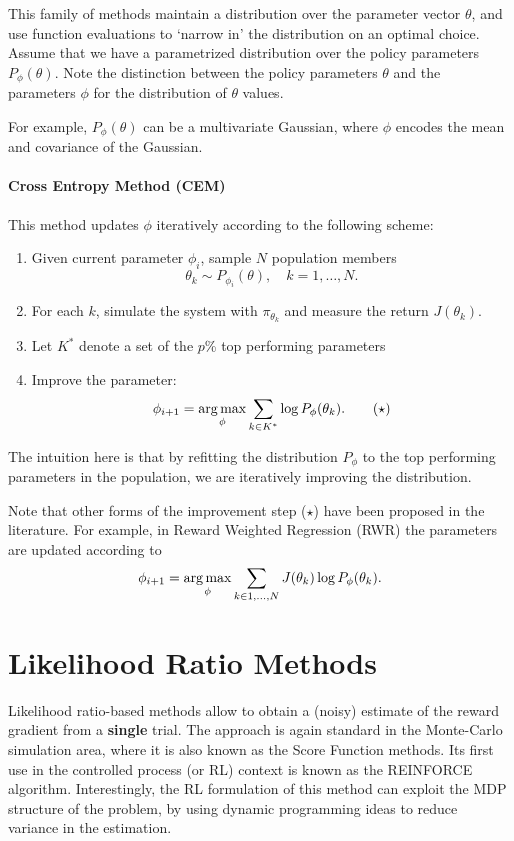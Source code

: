 This family of methods maintain a distribution over the parameter vector $\theta$, and use function evaluations to `narrow in' the distribution on an optimal choice. Assume that we have a parametrized distribution over the policy parameters $P_\phi(\theta)$. Note the distinction between the policy parameters $\theta$ and the parameters $\phi$ for the distribution of $\theta$ values.

For example, $P_\phi(\theta)$ can be a multivariate Gaussian, where $\phi$ encodes the mean and covariance of the Gaussian. 

\paragraph{Cross Entropy Method (CEM)}
This method updates $\phi$ iteratively according to the following scheme:
\begin{enumerate}
    \item Given current parameter $\phi_i$, sample $N$ population members
    $$
    \theta_k \sim P_{\phi_i}(\theta), \quad k=1,\dots,N.
    $$
    \item For each $k$, simulate the system with ${\pi_{\theta_k} }$ and measure the return $J(\theta_k)$.
    \item Let $K^*$ denote a set of the $p$\% top performing parameters
    \item Improve the parameter: 
    \begin{equation*}
    \phi_{i+1} = \argmax_\phi \sum_{k \in K^*} \log P_{\phi}(\theta_k). 
    \tag{$\star$}
    \end{equation*}
\end{enumerate}
The intuition here is that by refitting the distribution $P_\phi$ to the top performing parameters in the population, we are iteratively improving the distribution.

Note that other forms of the improvement step ($\star$) have been proposed in the literature. For example, in Reward Weighted Regression (RWR) the parameters are updated according to $$\phi_{i+1} = \argmax_\phi \sum_{k \in 1,\dots,N} J(\theta_k)\log P_{\phi}(\theta_k).$$

\section{Likelihood Ratio Methods}
Likelihood ratio-based methods allow to obtain a (noisy) estimate of the reward gradient from a \textbf{single} trial. The approach is again standard in the Monte-Carlo simulation area, where it is also known as the Score Function methods. Its first use in the controlled process (or RL) context is known as the REINFORCE algorithm. Interestingly, the RL formulation of this method can exploit the MDP structure of the problem, by using dynamic programming ideas to reduce variance in the estimation. 

